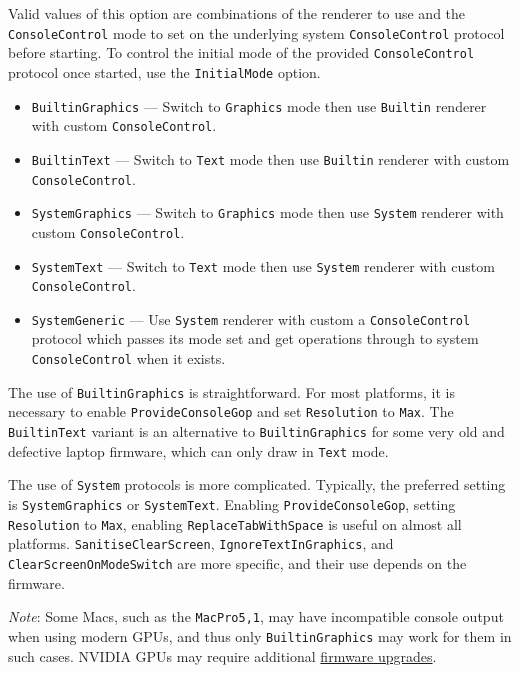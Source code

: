 \documentclass[]{article}
\providecommand{\tightlist}{%
  \setlength{\itemsep}{0pt}\setlength{\parskip}{0pt}}
\begin{document}
\begin{enumerate}
  Valid values of this option are combinations of the renderer to use
  and the \texttt{ConsoleControl} mode to set on the underlying system
  \texttt{ConsoleControl} protocol before starting. To control the initial
  mode of the provided \texttt{ConsoleControl} protocol once started, use
  the \texttt{InitialMode} option.

  \begin{itemize}
  \tightlist
  \item \texttt{BuiltinGraphics} --- Switch to \texttt{Graphics}
    mode then use \texttt{Builtin} renderer with
    custom \texttt{ConsoleControl}.
  \item \texttt{BuiltinText} --- Switch to \texttt{Text}
    mode then use \texttt{Builtin} renderer with
    custom \texttt{ConsoleControl}.
  \item \texttt{SystemGraphics} --- Switch to \texttt{Graphics}
    mode then use \texttt{System} renderer with
    custom \texttt{ConsoleControl}.
  \item \texttt{SystemText} --- Switch to \texttt{Text}
    mode then use \texttt{System} renderer with
    custom \texttt{ConsoleControl}.
  \item \texttt{SystemGeneric} --- Use \texttt{System} renderer with
    custom a \texttt{ConsoleControl} protocol which passes its mode set and
    get operations through to system \texttt{ConsoleControl} when it exists.
  \end{itemize}

  The use of \texttt{BuiltinGraphics} is straightforward.
  For most platforms, it is necessary to enable \texttt{ProvideConsoleGop}
  and set \texttt{Resolution} to \texttt{Max}. The \texttt{BuiltinText} variant is
  an alternative to \texttt{BuiltinGraphics} for some very old and defective
  laptop firmware, which can only draw in \texttt{Text} mode.

  The use of \texttt{System} protocols is more complicated. Typically,
  the preferred setting is \texttt{SystemGraphics} or \texttt{SystemText}.
  Enabling \texttt{ProvideConsoleGop}, setting \texttt{Resolution} to
  \texttt{Max}, enabling \texttt{ReplaceTabWithSpace} is useful on almost
  all platforms. \texttt{SanitiseClearScreen}, \texttt{IgnoreTextInGraphics},
  and \texttt{ClearScreenOnModeSwitch} are more specific, and their use
  depends on the firmware.

  \emph{Note}: Some Macs, such as the \texttt{MacPro5,1}, may have incompatible
  console output when using modern GPUs, and thus only \texttt{BuiltinGraphics}
  may work for them in such cases. NVIDIA GPUs may require additional
  \href{https://github.com/acidanthera/bugtracker/issues/1280}{firmware upgrades}.


\end{enumerate}
\end{document}
